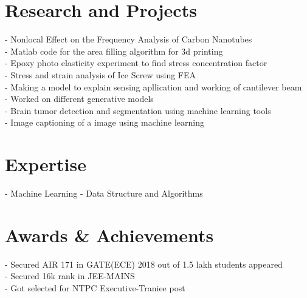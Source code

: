\documentclass[letterpaper]{twentysecondcv} %
\begin{document}
\section{Research and Projects}
\newline
\newline
- Nonlocal Effect on the Frequency Analysis of Carbon Nanotubes\\- Matlab code for the area filling algorithm for 3d printing
\\- Epoxy photo elasticity experiment to find stress concentration factor\\- Stress and strain analysis of Ice Screw using FEA
\\- Making a model to explain sensing apllication and working of cantilever beam 
\\- Worked on different generative models
\\- Brain tumor detection and segmentation using machine learning tools
\\- Image captioning of a image using machine learning

\section{Expertise}
\newline
\newline
- Machine Learning
- Data Structure and Algorithms



\section{ Awards \& Achievements}
\newline
\newline
- Secured AIR 171 in GATE(ECE) 2018 out of 1.5 lakh students appeared\\- Secured 16k rank in JEE-MAINS\\- Got selected for NTPC Executive-Traniee post
\end{document}
